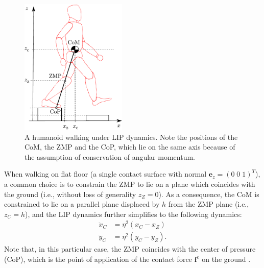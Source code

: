 \begin{figure}
    \centering
    \includegraphics[width=0.45\textwidth]{figures/LIPM_robot.pdf}
    \caption{A humanoid walking under LIP dynamics. Note the positions of the CoM, the ZMP and the CoP, which lie on the same axis because of the assumption of conservation of angular momentum.}
    \label{fig:LIPM-robot}
\end{figure}

When walking on flat floor (a single contact surface with normal
$\bm{e}_z=(0 \; 0\; 1)^T$),
a common choice is to constrain the ZMP to lie on
a plane which coincides with the ground (i.e., without loss of generality
$z_Z=0$). As a consequence, the CoM is constrained to lie on a parallel plane
displaced by $h$ from the ZMP plane (i.e., $z_C=h$), and
the LIP dynamics further simplifies to the following dynamics:
\begin{align*}
    \ddot{x}_C &= \eta^2 (x_C - x_Z) \\
    \ddot{y}_C &= \eta^2 (y_C - y_Z).
\end{align*}
Note that, in this particular case, the ZMP coincides with the center of
pressure (CoP), which is the point of application of the contact force
$\bm{f}^{\mathrm{c}}$ on the ground \cite{SardainBessonnet2004}.

